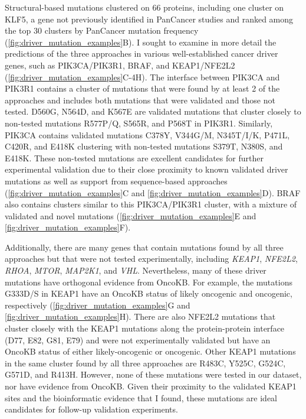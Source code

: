 Structural-based mutations clustered on 66 proteins, including one cluster on KLF5, a gene not previously identified in PanCancer studies and ranked among the top 30 clusters by PanCancer mutation frequency (\autoref{fig:driver_mutation_examples}B). I sought to examine in more detail the predictions of the three approaches in various well-established cancer driver genes, such as PIK3CA/PIK3R1, BRAF, and KEAP1/NFE2L2 (\autoref{fig:driver_mutation_examples}C-4H). The interface between PIK3CA and PIK3R1 contains a cluster of mutations that were found by at least 2 of the approaches and includes both mutations that were validated and those not tested. D560G, N564D, and K567E are validated mutations that cluster closely to non-tested mutations R577P/Q, S565R, and P568T in PIK3R1. Similarly, PIK3CA contains validated mutations C378Y, V344G/M, N345T/I/K, P471L, C420R, and E418K clustering with non-tested mutations S379T, N380S, and E418K. These non-tested mutations are excellent candidates for further experimental validation due to their close proximity to known validated driver mutations as well as support from sequence-based approaches (\autoref{fig:driver_mutation_examples}C and \ref{fig:driver_mutation_examples}D). BRAF also contains clusters similar to this PIK3CA/PIK3R1 cluster, with a mixture of validated and novel mutations (\autoref{fig:driver_mutation_examples}E and \autoref{fig:driver_mutation_examples}F). 

Additionally, there are many genes that contain mutations found by all three approaches but that were not tested experimentally, including \textit{KEAP1}, \textit{NFE2L2}, \textit{RHOA}, \textit{MTOR}, \textit{MAP2K1}, and \textit{VHL}. Nevertheless, many of these driver mutations have orthogonal evidence from OncoKB. For example, the mutations G333D/S in KEAP1 have an OncoKB status of likely oncogenic and oncogenic, respectively (\autoref{fig:driver_mutation_examples}G and \ref{fig:driver_mutation_examples}H). There are also NFE2L2 mutations that cluster closely with the KEAP1 mutations along the protein-protein interface (D77, E82, G81, E79) and were not experimentally validated but have an OncoKB status of either likely-oncogenic or oncogenic. Other KEAP1 mutations in the same cluster found by all three approaches are R483C, Y525C, G524C, G571D, and R413H. However, none of these mutations were tested in our dataset, nor have evidence from OncoKB. Given their proximity to the validated KEAP1 sites and the bioinformatic evidence that I found, these mutations are ideal candidates for follow-up validation experiments. 

